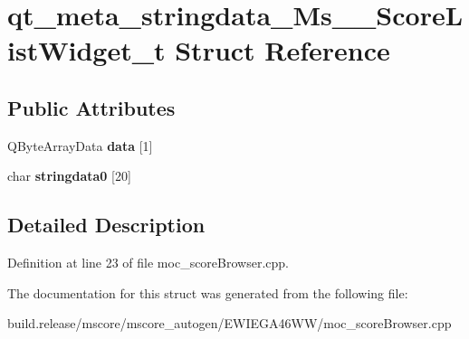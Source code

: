 \hypertarget{structqt__meta__stringdata___ms_____score_list_widget__t}{}\section{qt\+\_\+meta\+\_\+stringdata\+\_\+\+Ms\+\_\+\+\_\+\+Score\+List\+Widget\+\_\+t Struct Reference}
\label{structqt__meta__stringdata___ms_____score_list_widget__t}
\subsection*{Public Attributes}
\begin{DoxyCompactItemize}
\item 
\mbox{\label{structqt__meta__stringdata___ms_____score_list_widget__t_a5fd0550d6fb35a779fd49959fc740e96}} 
Q\+Byte\+Array\+Data {\bfseries data} \mbox{[}1\mbox{]}
\item 
\mbox{\label{structqt__meta__stringdata___ms_____score_list_widget__t_acaf695c656cf46def1b379fec07c183f}} 
char {\bfseries stringdata0} \mbox{[}20\mbox{]}
\end{DoxyCompactItemize}


\subsection{Detailed Description}


Definition at line 23 of file moc\+\_\+score\+Browser.\+cpp.



The documentation for this struct was generated from the following file\+:\begin{DoxyCompactItemize}
\item 
build.\+release/mscore/mscore\+\_\+autogen/\+E\+W\+I\+E\+G\+A46\+W\+W/moc\+\_\+score\+Browser.\+cpp\end{DoxyCompactItemize}

